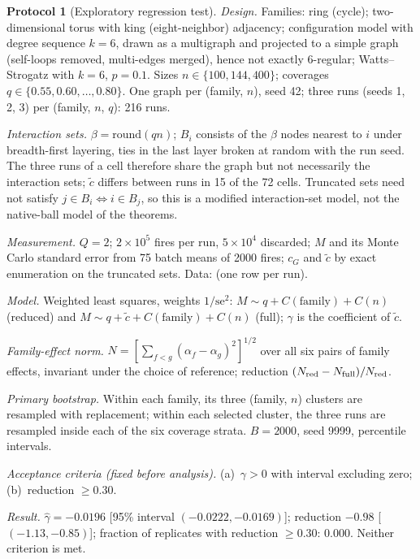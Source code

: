 \documentclass[aps,pre,onecolumn,superscriptaddress,amsmath,amssymb,longbibliography]{revtex4-2}
\theoremstyle{definition}
\newtheorem{protocol}[theorem]{Protocol}
\theoremstyle{remark}
\newcommand{\ctil}{\tilde c}
\newcommand{\cG}{c_G}
\begin{document}
\begin{protocol}[Exploratory regression test]
\label{prot:reg}
\emph{Design.} Families: ring (cycle); two-dimensional torus with king
(eight-neighbor) adjacency; configuration model with degree sequence
$k=6$, drawn as a multigraph and projected to a simple graph (self-loops
removed, multi-edges merged), hence not exactly 6-regular;
Watts--Strogatz with $k=6$, $p=0.1$. Sizes $n\in\{100,144,400\}$;
coverages $q\in\{0.55,0.60,\dots,0.80\}$. One graph per (family, $n$),
seed 42; three runs (seeds 1, 2, 3) per (family, $n$, $q$): 216 runs.

\emph{Interaction sets.} $\beta=\mathrm{round}(qn)$; $B_i$ consists of the
$\beta$ nodes nearest to $i$ under breadth-first layering, ties in the
last layer broken at random with the run seed. The three runs of a cell
therefore share the graph but not necessarily the interaction sets;
$\ctil$ differs between runs in 15 of the 72 cells. Truncated sets need
not satisfy $j\in B_i\iff i\in B_j$, so this is a modified
interaction-set model, not the native-ball model of the theorems.

\emph{Measurement.} $Q=2$; $2\times10^5$ fires per run, $5\times10^4$
discarded; $M$ and its Monte Carlo standard error from 75 batch means
of 2000 fires; $\cG$ and $\ctil$ by exact enumeration on the truncated
sets. Data:  (one row per run).

\emph{Model.} Weighted least squares, weights $1/\mathrm{se}^2$:
$M\sim q+C(\text{family})+C(n)$ (reduced) and
$M\sim q+\ctil+C(\text{family})+C(n)$ (full); $\gamma$ is the coefficient
of $\ctil$.

\emph{Family-effect norm.}
$N=[\sum_{f<g}(\alpha_f-\alpha_g)^2]^{1/2}$ over all six pairs of family
effects, invariant under the choice of reference; reduction
$(N_{\rm red}-N_{\rm full})/N_{\rm red}$.

\emph{Primary bootstrap.} Within each family, its three (family, $n$)
clusters are resampled with replacement; within each selected cluster,
the three runs are resampled inside each of the six coverage strata.
$B=2000$, seed 9999, percentile intervals.

\emph{Acceptance criteria (fixed before analysis).} (a)~$\gamma>0$ with
interval excluding zero; (b)~reduction $\ge0.30$.

\emph{Result.} $\hat\gamma=-0.0196$ [95\% interval $(-0.0222,-0.0169)$];
reduction $-0.98$ [$(-1.13,-0.85)$]; fraction of replicates with
reduction $\ge0.30$: $0.000$. Neither criterion is met.


\end{protocol}
\end{document}
